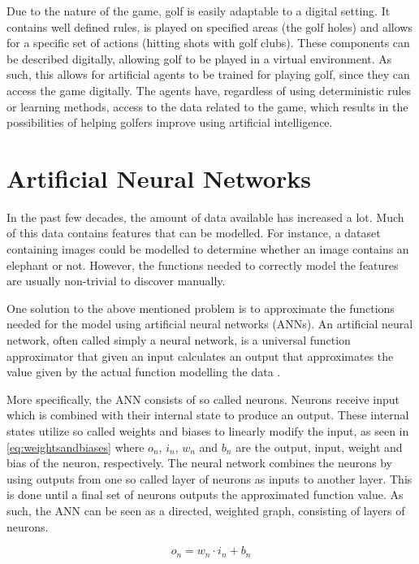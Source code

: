 \documentclass{kththesis}
\begin{document}
Due to the nature of the game, golf is easily adaptable to a digital setting. It contains well defined rules, is played on specified areas (the golf holes) and allows for a specific set of actions (hitting shots with golf clubs). These components can be described digitally, allowing golf to be played in a virtual environment. As such, this allows for artificial agents to be trained for playing golf, since they can access the game digitally. The agents have, regardless of using deterministic rules or learning methods, access to the data related to the game, which results in the possibilities of helping golfers improve using artificial intelligence.

\section{Artificial Neural Networks}
\label{sec:neuralnetworks}
In the past few decades, the amount of data available has increased a lot. Much of this data contains features that can be modelled. For instance, a dataset containing images could be modelled to determine whether an image contains an elephant or not. However, the functions needed to correctly model the features are usually non-trivial to discover manually.

One solution to the above mentioned problem is to approximate the functions needed for the model using artificial neural networks (ANNs). An artificial neural network, often called simply a neural network, is a universal function approximator that given an input calculates an output that approximates the value given by the actual function modelling the data \parencite{rojas2013neural}. 

More specifically, the ANN consists of so called neurons. Neurons receive input which is combined with their internal state to produce an output. These internal states utilize so called weights and biases to linearly modify the input, as seen in \autoref{eq:weightsandbiases} where $o_n$, $i_n$, $w_n$ and $b_n$ are the output, input, weight and bias of the neuron, respectively. The neural network combines the neurons by using outputs from one so called layer of neurons as inputs to another layer. This is done until a final set of neurons outputs the approximated function value. As such, the ANN can be seen as a directed, weighted graph, consisting of layers of neurons. \parencite{lecun2015deep} 

\begin{equation}
\label{eq:weightsandbiases}
o_n = w_n \cdot i_n + b_n 
\end{equation}
\end{document}
